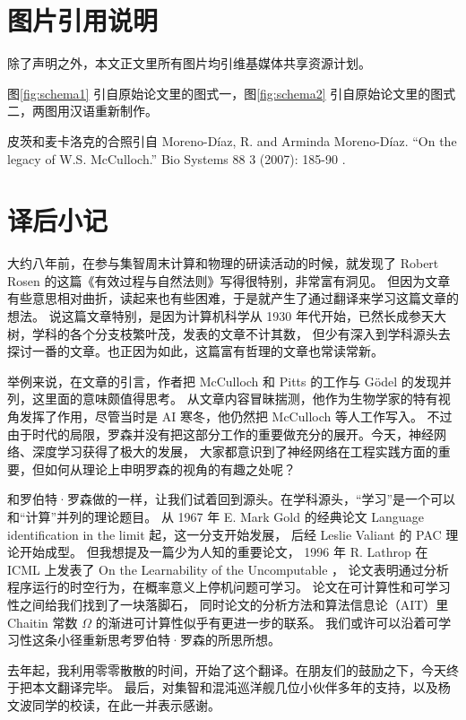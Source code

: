 \documentclass[a4paper,12pt]{article}
\begin{document}
\newpage
\section{图片引用说明}

除了声明之外，本文正文里所有图片均引维基媒体共享资源计划。

图\ref{fig:schema1} 引自原始论文里的图式一，图\ref{fig:schema2} 引自原始论文里的图式二，两图用汉语重新制作。

皮茨和麦卡洛克的合照引自 Moreno-Díaz, R. and Arminda Moreno-Díaz. “On the legacy of W.S. McCulloch.” Bio Systems 88 3 (2007): 185-90 .


\newpage
\section{译后小记}

大约八年前，在参与集智周末计算和物理的研读活动的时候，就发现了 Robert Rosen 的这篇《有效过程与自然法则》写得很特别，非常富有洞见。
但因为文章有些意思相对曲折，读起来也有些困难，于是就产生了通过翻译来学习这篇文章的想法。
说这篇文章特别，是因为计算机科学从 1930 年代开始，已然长成参天大树，学科的各个分支枝繁叶茂，发表的文章不计其数，
但少有深入到学科源头去探讨一番的文章。也正因为如此，这篇富有哲理的文章也常读常新。

举例来说，在文章的引言，作者把 McCulloch 和 Pitts 的工作与 G{\"o}del 的发现并列，这里面的意味颇值得思考。
从文章内容冒昧揣测，他作为生物学家的特有视角发挥了作用，尽管当时是 AI 寒冬，他仍然把 McCulloch 等人工作写入。
不过由于时代的局限，罗森并没有把这部分工作的重要做充分的展开。今天，神经网络、深度学习获得了极大的发展，
大家都意识到了神经网络在工程实践方面的重要，但如何从理论上申明罗森的视角的有趣之处呢？

和罗伯特·罗森做的一样，让我们试着回到源头。在学科源头，“学习”是一个可以和“计算”并列的理论题目。
从 1967 年 E. Mark Gold 的经典论文 Language identification in the limit 起，这一分支开始发展， 后经 Leslie Valiant 的 PAC 理论开始成型。
但我想提及一篇少为人知的重要论文， 1996 年 R. Lathrop 在 ICML 上发表了 On the Learnability of the Uncomputable ，
论文表明通过分析程序运行的时空行为，在概率意义上停机问题可学习。 论文在可计算性和可学习性之间给我们找到了一块落脚石，
同时论文的分析方法和算法信息论（AIT）里 Chaitin 常数 $\Omega$ 的渐进可计算性似乎有更进一步的联系。
我们或许可以沿着可学习性这条小径重新思考罗伯特·罗森的所思所想。

去年起，我利用零零散散的时间，开始了这个翻译。在朋友们的鼓励之下，今天终于把本文翻译完毕。
最后，对集智和混沌巡洋舰几位小伙伴多年的支持，以及杨文波同学的校读，在此一并表示感谢。
\end{document}
